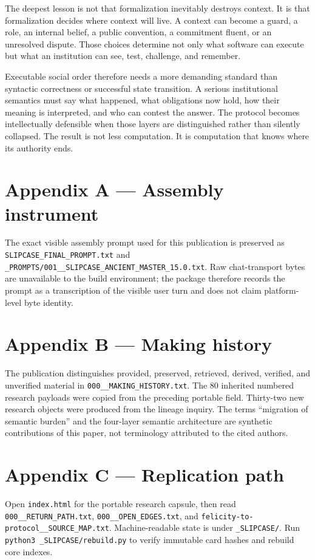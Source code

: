 \documentclass[11pt]{article}
\begin{document}
The deepest lesson is not that formalization inevitably destroys context. It is that formalization decides where context will live. A context can become a guard, a role, an internal belief, a public convention, a commitment fluent, or an unresolved dispute. Those choices determine not only what software can execute but what an institution can see, test, challenge, and remember.

Executable social order therefore needs a more demanding standard than syntactic correctness or successful state transition. A serious institutional semantics must say what happened, what obligations now hold, how their meaning is interpreted, and who can contest the answer. The protocol becomes intellectually defensible when those layers are distinguished rather than silently collapsed. The result is not less computation. It is computation that knows where its authority ends.

\section*{Appendix A --- Assembly instrument}
The exact visible assembly prompt used for this publication is preserved as \nolinkurl{SLIPCASE_FINAL_PROMPT.txt} and \nolinkurl{_PROMPTS/001__SLIPCASE_ANCIENT_MASTER_15.0.txt}. Raw chat-transport bytes are unavailable to the build environment; the package therefore records the prompt as a transcription of the visible user turn and does not claim platform-level byte identity.

\section*{Appendix B --- Making history}
The publication distinguishes provided, preserved, retrieved, derived, verified, and unverified material in \nolinkurl{000__MAKING_HISTORY.txt}. The 80 inherited numbered research payloads were copied from the preceding portable field. Thirty-two new research objects were produced from the lineage inquiry. The terms ``migration of semantic burden'' and the four-layer semantic architecture are synthetic contributions of this paper, not terminology attributed to the cited authors.

\section*{Appendix C --- Replication path}
Open \nolinkurl{index.html} for the portable research capsule, then read \nolinkurl{000__RETURN_PATH.txt}, \nolinkurl{000__OPEN_EDGES.txt}, and \nolinkurl{felicity-to-protocol__SOURCE_MAP.txt}. Machine-readable state is under \nolinkurl{_SLIPCASE/}. Run \nolinkurl{python3 _SLIPCASE/rebuild.py} to verify immutable card hashes and rebuild core indexes.
\end{document}
